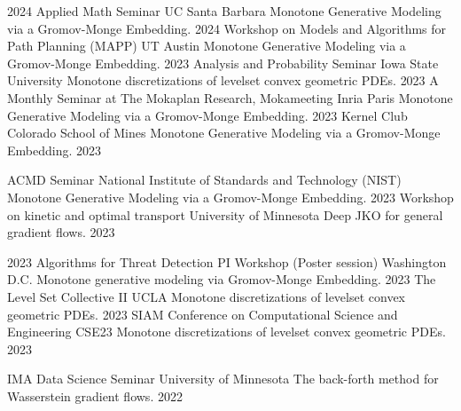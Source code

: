 \begin{cvtalks}
    {2024}
\cvtalk
    {Applied Math Seminar} %
    {UC Santa Barbara}
    {Monotone Generative Modeling via a Gromov-Monge Embedding.} %
    {2024} %
\cvtalk
    {Workshop on Models and Algorithms for Path Planning (MAPP)} %
    {UT Austin}
    {Monotone Generative Modeling via a Gromov-Monge Embedding.} %
    {2023} %
\cvtalk
    {Analysis and Probability Seminar}
    {Iowa State University}
    {Monotone discretizations of levelset convex geometric PDEs.}
    {2023}
\cvtalk
    {A Monthly Seminar at The Mokaplan Research, Mokameeting} %
    {Inria Paris}
    {Monotone Generative Modeling via a Gromov-Monge Embedding.} %
    {2023} %
\cvtalk
    {Kernel Club} %
    {Colorado School of Mines}
    {Monotone Generative Modeling via a Gromov-Monge Embedding.} %
    {2023} %

\cvtalk
    {ACMD Seminar} %
    {National Institute of Standards and Technology (NIST)}
    {Monotone Generative Modeling via a Gromov-Monge Embedding.} %
    {2023} %
\cvtalk
    {Workshop on kinetic and optimal transport} %
    {University of Minnesota}
    {Deep JKO for general gradient flows.} %
    {2023} %
  
  \cvtalk
    {2023 Algorithms for Threat Detection PI Workshop (Poster session)} %
    {Washington D.C.}
    {Monotone generative modeling via Gromov-Monge Embedding.} %
    {2023} %
  \cvtalk
    {The Level Set Collective II} %
    {UCLA}
    {Monotone discretizations of levelset convex geometric PDEs.} %
    {2023} %
  \cvtalk
    {SIAM Conference on Computational Science and Engineering } %
    {CSE23}
    {Monotone discretizations of levelset convex geometric PDEs.} %
    {2023} %

  \cvtalk
    {IMA Data Science Seminar} %
    {University of Minnesota}
    {The back-forth method for Wasserstein gradient flows.} %
    {2022} %


\end{cvtalks}
